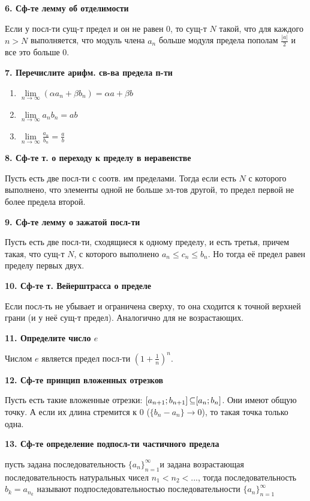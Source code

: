 	\textbf{6. Сф-те лемму об отделимости}
	
	Если у посл-ти сущ-т предел и он не равен 0, то сущ-т $N$ такой,  что для каждого $n > N$ выполняется, что модуль члена $a_n$ больше модуля предела пополам  $\frac{|a|}{2}$ и все это больше 0.
	
	\textbf{7. Перечислите арифм. св-ва предела п-ти}
	
	\begin{enumerate}
		\item  $\lim\limits_{n\rightarrow\infty} (\alpha a_n + \beta b_n) = \alpha a + \beta b$
		\item  $\lim\limits_{n\rightarrow\infty} a_nb_n = ab$
		\item $\lim\limits_{n\rightarrow\infty} \frac{a_n}{b_n} = \frac{a}{b}$
	\end{enumerate}

	\textbf{8. Сф-те т. о переходу к пределу в неравенстве}
	
	Пусть есть две посл-ти с соотв. им пределами. Тогда если есть $N$ с которого выполнено, что элементы одной не больше эл-тов другой, то предел первой не более предела второй.
	
	\textbf{9. Сф-те лемму о зажатой посл-ти}
	
	Пусть есть две посл-ти, сходящиеся к одному пределу, и есть третья, причем такая, что сущ-т $N$, с которого выполнено $a_n \le c_n \le b_n$. Но тогда её предел равен пределу первых двух.
	
	\textbf{10. Сф-те т. Вейерштрасса о пределе} 
	
	Если посл-ть не убывает и ограничена сверху, то она сходится к точной верхней грани (и у неё сущ-т предел). Аналогично для не возрастающих.
	
	\textbf{11. Определите число $e$ }
	
	Числом $e$ является предел посл-ти $(1 + \frac{1}{n})^n$.
	
	\textbf{12. Сф-те принцип вложенных отрезков}
	
	Пусть есть такие вложенные отрезки: $[a_{n+1}; b_{n+1} ]\operatorname{\subseteq} [a_n;b_n]$. Они имеют общую точку. А если их длина стремится к 0 ($\{b_n - a_n\} \rightarrow 0$), то такая точка только одна.
	
	\textbf{13. Сф-те определение подпосл-ти частичного предела}
	
	пусть задана последовательность $ \textstyle\{a_n\}_{n=1}^{\infty}$и задана возрастающая последовательность натуральных чисел $n_1 < n_2 < ...$, тогда последовательность $b_k = a_{n_k}$ называют подпоследовательностью последовательности $ \textstyle\{a_n\}_{n=1}^{\infty}$
	
